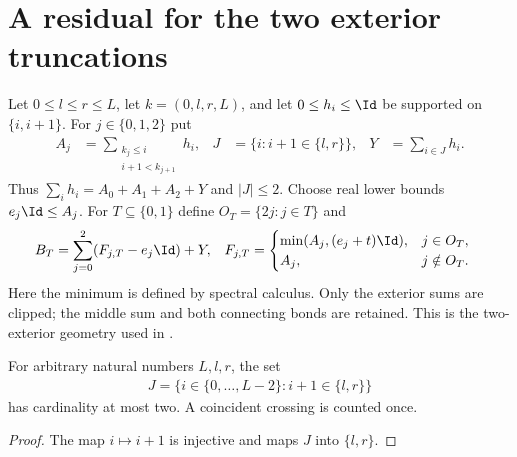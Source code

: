 \section{A residual for the two exterior truncations}

\begin{definition}
    \label{def:aklv_two_block_truncation}
    \leanok
    Let $0\le l\le r\le L$, let $k=(0,l,r,L)$, and let
    $0\le h_i\le\Id$ be supported on $\{i,i+1\}$.
    For $j\in\{0,1,2\}$ put
    \begin{align}
        A_j & =\sum_{\substack{k_j\le i                          \\i+1<k_{j+1}}}h_i, &
        J   & =\{i:i+1\in\{l,r\}\},     & Y & =\sum_{i\in J}h_i.
        \label{eq:aklv_two_block_regions}
    \end{align}
    Thus $\sum_i h_i=A_0+A_1+A_2+Y$ and $|J|\le2$.
    Choose real lower bounds $e_j\Id\le A_j$.
    For $T\subseteq\{0,1\}$ define $O_T=\{2j:j\in T\}$ and
    \begin{align}
        B_T     & =\sum_{j=0}^2(F_{j,T}-e_j\Id)+Y, &
        F_{j,T} & =
        \begin{cases}
            \min(A_j,(e_j+t)\Id), & j\in O_T,    \\
            A_j,                  & j\notin O_T.
        \end{cases}
        \label{eq:aklv_two_block_hamiltonian}
    \end{align}
    Here the minimum is defined by spectral calculus.
    Only the exterior sums are clipped; the middle sum and both connecting bonds
    are retained. This is the two-exterior geometry used in
    \cite[Section~6.1, after (5)]{Arad2013AreaLaw}.
\end{definition}

\begin{lemma}
    \label{lem:two_cut_crossing_card}
    \leanok
    For arbitrary natural numbers $L,l,r$, the set
    \begin{align}
        J=\{i\in\{0,\ldots,L-2\}:i+1\in\{l,r\}\}
    \end{align}
    has cardinality at most two. A coincident crossing is counted once.
\end{lemma}
\begin{proof}\leanok
    The map $i\mapsto i+1$ is injective and maps $J$ into $\{l,r\}$.
\end{proof}

